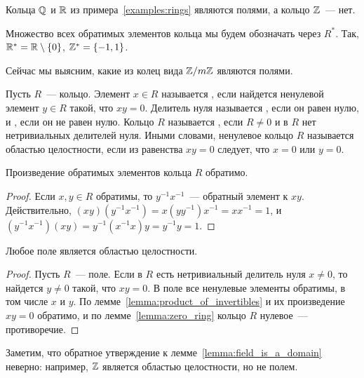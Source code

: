 \begin{examples}
Кольца $\mathbb Q$ и $\mathbb R$ из примера~\ref{examples:rings} являются
полями, а кольцо $\mathbb Z$~--- нет.
\end{examples}

Множество всех обратимых элементов кольца мы будем обозначать через
$R^*$. Так, $\mathbb R^* = \mathbb R\setminus\{0\}$, $\mathbb Z^* = \{-1,1\}$.

Сейчас мы выясним, какие из колец вида $\mathbb Z/m\mathbb Z$ являются полями.

\begin{definition}\label{def:domain}
Пусть $R$~--- кольцо. Элемент $x\in R$ называется , если найдется ненулевой элемент $y\in
R$ такой, что $xy = 0$. Делитель нуля называется
, если он равен
нулю, и , если
он не равен нулю. Кольцо $R$ называется
, если $R\neq 0$
и в $R$ нет нетривиальных делителей нуля. Иными словами, ненулевое
кольцо $R$ называется областью целостности, если из
равенства $xy = 0$ следует, что $x = 0$ или $y = 0$.
\end{definition}

\begin{lemma}\label{lemma:product_of_invertibles}
Произведение обратимых элементов кольца $R$ обратимо.
\end{lemma}
\begin{proof}
Если $x,y\in R$ обратимы, то $y^{-1}x^{-1}$~--- обратный элемент
к $xy$. Действительно, $(xy)(y^{-1}x^{-1}) = x(yy^{-1})x^{-1} =
xx^{-1} = 1$, и $(y^{-1}x^{-1})(xy) = y^{-1}(x^{-1}x)y =
y^{-1}y = 1$.
\end{proof}

\begin{lemma}\label{lemma:field_is_a_domain}
Любое поле является областью целостности.
\end{lemma}
\begin{proof}
Пусть $R$~--- поле. Если в $R$ есть нетривиальный делитель нуля $x\neq
0$, то найдется $y\neq 0$ такой, что $xy = 0$. В поле все ненулевые
элементы обратимы, в том числе $x$ и $y$. По
лемме~\ref{lemma:product_of_invertibles} и их произведение $xy = 0$
обратимо, и по лемме~\ref{lemma:zero_ring} кольцо $R$ нулевое~---
противоречие.
\end{proof}

Заметим, что обратное утверждение к
лемме~\ref{lemma:field_is_a_domain} неверно: например, $\mathbb Z$
является областью целостности, но не полем.

